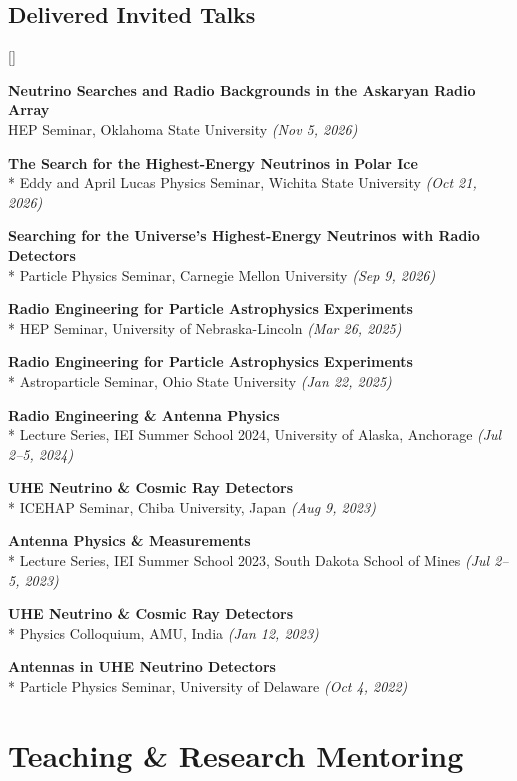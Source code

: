 \documentclass[10pt,letterpaper]{report}
\newcommand{\cvdate}[1]{{\normalfont\itshape\color{Muted}(#1)}}
\newcounter{cvitemrank}
\newenvironment{cvnumbered}[1]{%
  \setcounter{cvitemrank}{#1}%
  \begin{list}{\textcolor{Muted}{[\arabic{cvitemrank}]}}{%
    \setlength{\leftmargin}{2.25em}\setlength{\labelwidth}{1.65em}
    \setlength{\labelsep}{0.45em}\setlength{\itemindent}{0pt}
    \setlength{\itemsep}{0.3pt}\setlength{\topsep}{1.5pt}
    \setlength{\parsep}{0pt}\setlength{\partopsep}{0pt}}%
}{\end{list}}
\newcommand{\cvnumitem}{\item\addtocounter{cvitemrank}{-1}}
\begin{document}
\pagebreak
\subsection*{Delivered Invited Talks}
\begin{cvnumbered}{10}
    \cvnumitem \textbf{Neutrino Searches and Radio Backgrounds in the Askaryan Radio Array}\\ 
    HEP Seminar, Oklahoma State University \cvdate{Nov 5, 2026}
    \cvnumitem \textbf{The Search for the Highest-Energy Neutrinos in Polar Ice}\\*
    Eddy and April Lucas Physics Seminar, Wichita State University \cvdate{Oct 21, 2026}
    \cvnumitem \textbf{Searching for the Universe's Highest-Energy Neutrinos with Radio Detectors}\\*
    Particle Physics Seminar, Carnegie Mellon University \cvdate{Sep 9, 2026}
    \cvnumitem \textbf{Radio Engineering for Particle Astrophysics Experiments}\\*
    HEP Seminar, University of Nebraska-Lincoln \cvdate{Mar 26, 2025}
    \cvnumitem \textbf{Radio Engineering for Particle Astrophysics Experiments} \\*
    Astroparticle Seminar, Ohio State University \cvdate{Jan 22, 2025}
    \cvnumitem \textbf{Radio Engineering \& Antenna Physics} \\*
    Lecture Series, IEI Summer School 2024, University of Alaska, Anchorage \cvdate{Jul 2--5, 2024}
    \cvnumitem \textbf{UHE Neutrino \& Cosmic Ray Detectors} \\*
    ICEHAP Seminar, Chiba University, Japan \cvdate{Aug 9, 2023}
    \cvnumitem \textbf{Antenna Physics \& Measurements} \\*
    Lecture Series, IEI Summer School 2023, South Dakota School of Mines \cvdate{Jul 2--5, 2023}
    \cvnumitem \textbf{UHE Neutrino \& Cosmic Ray Detectors} \\*
    Physics Colloquium, AMU, India \cvdate{Jan 12, 2023}
    \cvnumitem \textbf{Antennas in UHE Neutrino Detectors} \\*
    Particle Physics Seminar, University of Delaware \cvdate{Oct 4, 2022}
\end{cvnumbered}

\section*{Teaching \& Research Mentoring}
\end{document}
